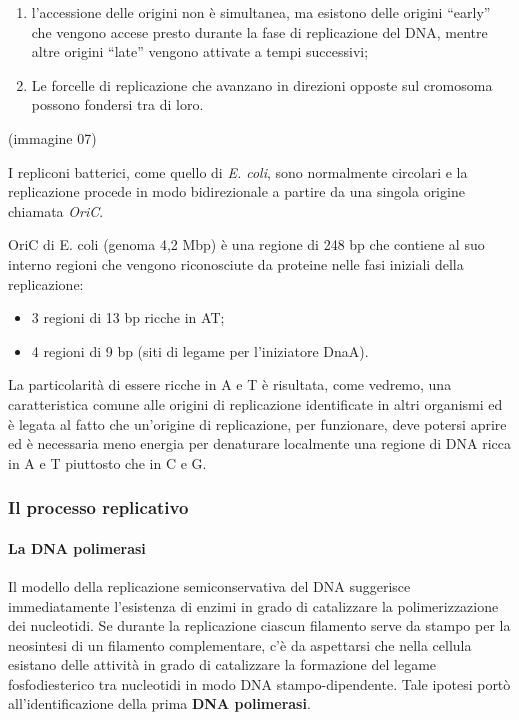\documentclass[]{article}
\begin{document}
\begin{enumerate}
\def\labelenumi{\arabic{enumi}.}
\itemsep1pt\parskip0pt
\item
  l'accessione delle origini non è simultanea, ma esistono delle origini
  ``early'' che vengono accese presto durante la fase di replicazione
  del DNA, mentre altre origini ``late'' vengono attivate a tempi
  successivi;
\item
  Le forcelle di replicazione che avanzano in direzioni opposte sul
  cromosoma possono fondersi tra di loro.
\end{enumerate}

(immagine 07)

I repliconi batterici, come quello di \emph{E. coli}, sono normalmente
circolari e la replicazione procede in modo bidirezionale a partire da
una singola origine chiamata \emph{OriC}.

OriC di E. coli (genoma 4,2 Mbp) è una regione di 248 bp che contiene al
suo interno regioni che vengono riconosciute da proteine nelle fasi
iniziali della replicazione:

\begin{itemize}
\itemsep1pt\parskip0pt
\item
  3 regioni di 13 bp ricche in AT;
\item
  4 regioni di 9 bp (siti di legame per l'iniziatore DnaA).
\end{itemize}

La particolarità di essere ricche in A e T è risultata, come vedremo,
una caratteristica comune alle origini di replicazione identificate in
altri organismi ed è legata al fatto che un'origine di replicazione, per
funzionare, deve potersi aprire ed è necessaria meno energia per
denaturare localmente una regione di DNA ricca in A e T piuttosto che in
C e G.

\subsubsection{Il processo replicativo}\label{il-processo-replicativo}

\paragraph{La DNA polimerasi}\label{la-dna-polimerasi}

Il modello della replicazione semiconservativa del DNA suggerisce
immediatamente l'esistenza di enzimi in grado di catalizzare la
polimerizzazione dei nucleotidi. Se durante la replicazione ciascun
filamento serve da stampo per la neosintesi di un filamento
complementare, c'è da aspettarsi che nella cellula esistano delle
attività in grado di catalizzare la formazione del legame
fosfodiesterico tra nucleotidi in modo DNA stampo-dipendente. Tale
ipotesi portò all'identificazione della prima \textbf{DNA polimerasi}.
\end{document}
